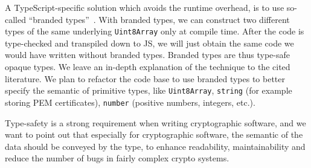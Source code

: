 A TypeScript-specific solution which avoids the runtime overhead, is to use
so-called ``branded types''~\cite{vanderkam2019effective, goldberg2022learning}. 
With branded types, we can construct two 
different types of the same underlying \texttt{Uint8Array} only
at compile time. After the code is type-checked and transpiled down to JS,
we will just obtain the same code we would have written without branded types.
Branded types are thus type-safe opaque types. We leave an in-depth explanation
of the technique to the cited literature. We plan to refactor the code base
to use branded types to better specify the semantic of primitive types,
like \texttt{Uint8Array}, \texttt{string} (for example storing PEM certificates),
\texttt{number} (positive numbers, integers, etc.).

Type-safety is a strong requirement when writing
cryptographic software, and we want to point out that especially for cryptographic
software, the semantic of the data should be conveyed by the type,
to enhance readability, maintainability and reduce the number of
bugs in fairly complex crypto systems.